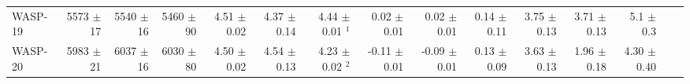 \begin{sidewaystable*}[t!]
{\begin{tabular}{l r r r r r r r r r r r r r r}
WASP-19  
&  5573  $\pm$ 17 
& 5540  $\pm$ 16
&  5460 $\pm$ 90 
&   4.51  $\pm$ 0.02  
&  4.37  $\pm$ 0.14 
&  4.44  $\pm$ 0.01 $^1$
&  0.02  $\pm$ 0.01 
& 0.02  $\pm$ 0.01 
&  0.14   $\pm$ 0.11 
&  3.75  $\pm$ 0.13 
& 3.71  $\pm$ 0.13 
&  5.1   $\pm$ 0.3   \\




WASP-20  
&  5983  $\pm$ 21
&  6037  $\pm$ 16 
&  6030 $\pm$ 80 
&   4.50  $\pm$ 0.02  
&  4.54  $\pm$ 0.13 
&  4.23  $\pm$ 0.02 $^2$ 
& -0.11  $\pm$ 0.01 
& -0.09  $\pm$ 0.01 
&  0.13   $\pm$ 0.09
&  3.63  $\pm$ 0.13 
& 1.96  $\pm$ 0.18
& 4.30   $\pm$ 0.40 \\



\end{tabular}}
\end{sidewaystable*}
